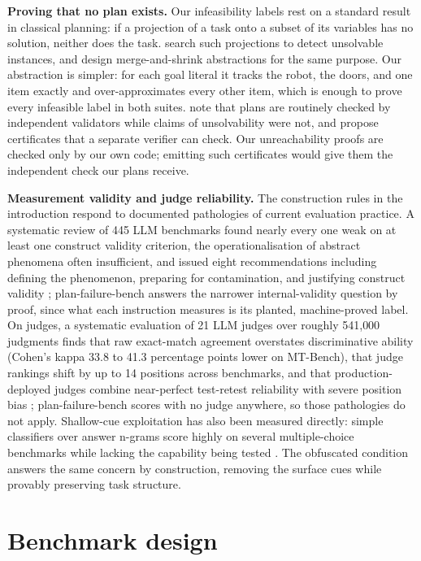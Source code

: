 \documentclass[10pt]{article}
\newcommand{\benchname}{plan-failure-bench}
\begin{document}
\textbf{Proving that no plan exists.} Our infeasibility labels rest on
a standard result in classical planning: if a projection of a task onto
a subset of its variables has no solution, neither does the task.
\citet{backstrom2013unsolvable} search such projections to detect
unsolvable instances, and \citet{hoffmann2014distance} design
merge-and-shrink abstractions for the same purpose. Our abstraction is
simpler: for each goal literal it tracks the robot, the doors, and one
item exactly and over-approximates every other item, which is enough
to prove every infeasible label in both suites.
\citet{eriksson2017certificates} note that plans are routinely checked
by independent validators while claims of unsolvability were not, and
propose certificates that a separate verifier can check. Our
unreachability proofs are checked only by our own code; emitting such
certificates would give them the independent check our plans receive.

\textbf{Measurement validity and judge reliability.} The construction
rules in the introduction respond to documented pathologies of
current evaluation practice. A systematic
review of 445 LLM benchmarks found nearly every one weak on at least
one construct validity criterion, the operationalisation of abstract
phenomena often insufficient, and issued eight recommendations
including defining the phenomenon, preparing for contamination, and
justifying construct validity \citep{bean2025validity}; \benchname{}
answers the narrower internal-validity question by proof, since what
each instruction measures is its planted, machine-proved label. On judges, a systematic evaluation of 21 LLM
judges over roughly 541{,}000 judgments finds that raw exact-match
agreement overstates discriminative ability (Cohen's kappa 33.8 to
41.3 percentage points lower on MT-Bench), that judge rankings shift
by up to 14 positions across benchmarks, and that production-deployed
judges combine near-perfect test-retest reliability with severe
position bias \citep{norman2026judges}; \benchname{} scores with no
judge anywhere, so those pathologies do not apply. Shallow-cue
exploitation has also been measured directly: simple classifiers over
answer n-grams score highly on several multiple-choice benchmarks
while lacking the capability being tested
\citep{pacchiardi2024cleverhans}. The obfuscated condition answers the
same concern by construction, removing the surface cues while provably
preserving task structure.

\section{Benchmark design}
\end{document}

